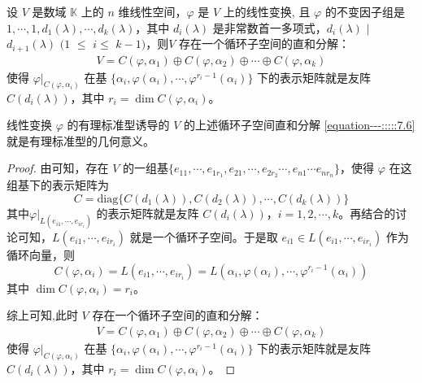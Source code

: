 \documentclass[../../main.tex]{subfiles}%
\begin{document}
\begin{theorem}[有理标准型的几何意义]\label{theorem:有理标准型的几何意义}
设 \(V\) 是数域 \(\mathbb{K}\) 上的 \(n\) 维线性空间，\(\varphi\) 是 \(V\) 上的线性变换, 且 \(\varphi\) 的不变因子组是 \(1,\cdots,1,d_1(\lambda),\cdots,d_k(\lambda)\)，其中 \(d_i(\lambda)\) 是非常数首一多项式，$d_i(\lambda)$ $\mid$ $d_{i + 1}(\lambda)$ $(1$ $\leqslant $ $i\leqslant $  $k - 1)$，则\(V\) 存在一个循环子空间的直和分解：
\begin{align}
V = C(\varphi,\alpha_1)\oplus C(\varphi,\alpha_2)\oplus\cdots\oplus C(\varphi,\alpha_k)\label{equation---:::::7.6}
\end{align}
使得 \(\varphi|_{C(\varphi,\alpha_i)}\) 在基 \(\{\alpha_i,\varphi(\alpha_i),\cdots,\varphi^{r_i - 1}(\alpha_i)\}\) 下的表示矩阵就是友阵 \(C(d_i(\lambda))\)，其中 \(r_i = \dim C(\varphi,\alpha_i)\)。
\end{theorem}
\begin{note}
线性变换 \(\varphi\) 的有理标准型诱导的 \(V\) 的上述循环子空间直和分解 \eqref{equation---:::::7.6}就是有理标准型的几何意义。 
\end{note}
\begin{proof}

由可知，存在 \(V\) 的一组基$\{e_{11},\cdots ,e_{1r_1},e_{21},\cdots,e_{2r_2}\cdots,e_{n1}\cdots e_{nr_n}\}$，使得 \(\varphi\) 在这组基下的表示矩阵为
\[
C=\mathrm{diag}\{C(d_1(\lambda)),C(d_2(\lambda)),\cdots,C(d_k(\lambda))\}
\]
其中\(\varphi|_{L(e_{i1},\cdots,e_{ir_i})}\) 的表示矩阵就是友阵 \(C(d_i(\lambda))\)，\(i = 1,2,\cdots,k\)。再结合的讨论可知，\(L(e_{i1},\cdots,e_{ir_i})\) 就是一个循环子空间。于是取 \(e_{i1}\in L(e_{i1},\cdots,e_{ir_i})\) 作为循环向量，则
\[
C(\varphi,\alpha_i)=L(e_{i1},\cdots,e_{ir_i})=L(\alpha_i,\varphi(\alpha_i),\cdots,\varphi^{r_i - 1}(\alpha_i))
\]
其中 \(\dim C(\varphi,\alpha_i)=r_i\)。

综上可知,此时 \(V\) 存在一个循环子空间的直和分解：
\begin{align*}
V = C(\varphi,\alpha_1)\oplus C(\varphi,\alpha_2)\oplus\cdots\oplus C(\varphi,\alpha_k)
\end{align*}
使得 \(\varphi|_{C(\varphi,\alpha_i)}\) 在基 \(\{\alpha_i,\varphi(\alpha_i),\cdots,\varphi^{r_i - 1}(\alpha_i)\}\) 下的表示矩阵就是友阵 \(C(d_i(\lambda))\)，其中 \(r_i = \dim C(\varphi,\alpha_i)\)。

\end{proof}
\end{document}
